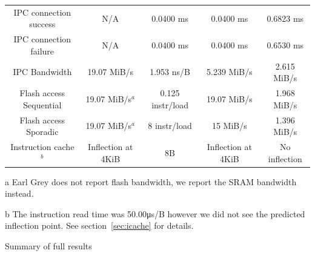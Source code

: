 \documentclass{article}
\begin{document}
\begin{landscape}
\begin{threeparttable}[tp]
\begin{tabular}{||c c c c c||}
 IPC connection success & N/A & 0.0400 \si{\milli\second} & 0.0400 \si{\milli\second} & 0.6823 \si{\milli\second} \\
 IPC connection failure & N/A & 0.0400 \si{\milli\second} & 0.0400 \si{\milli\second} & 0.6530 \si{\milli\second} \\
 IPC Bandwidth        & 19.07 MiB/s & 1.953 \si{\nano\second}/B & 5.239 MiB/s & 2.615 MiB/s \\
 Flash access Sequential & 19.07 MiB/s$^{a}$ & 0.125 instr/load & 19.07 MiB/s & 1.968 MiB/s \\
 Flash access Sporadic   & 19.07 MiB/s$^{a}$ & 8 instr/load     & 15 MiB/s & 1.396 MiB/s\\
 Instruction cache$^{b}$ & Inflection at 4KiB & 8B & Inflection at 4KiB & No inflection \\
 [1ex] 
 \hline
\end{tabular}
\begin{tablenotes}
    \item[a]{Earl Grey does not report flash bandwidth, we report the SRAM bandwidth instead.}
    \item[b]{The instruction read time was 50.00\si{\micro\second}/B however we did not see the predicted inflection point. See section~\ref{sec:icache} for details.}
\end{tablenotes}

\caption{Summary of full results}
\label{table:full-results}
\end{threeparttable}
\end{landscape}

\clearpage
\printbibliography
\end{document}
